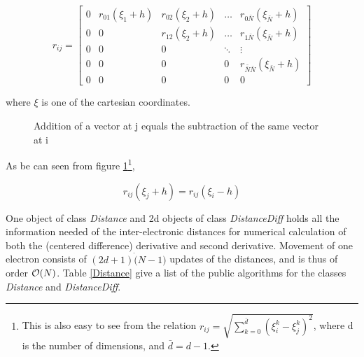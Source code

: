 \begin{equation}
  r_{ij} = \left[
  \begin{array}{ccccc}
    0 & r_{01}(\xi_1+h) & r_{02}(\xi_2+h)&\dots & r_{0 \bar{N}}(\xi_{\bar{N}}+h) \\
    0 &        0        & r_{12}(\xi_2+h)&\dots & r_{1 \bar{N}}(\xi_{\bar{N}}+h) \\
    0 &        0        &          0            &\ddots &  \vdots       \\
    0 &        0        &          0            &   0   &r_{\bar{\bar{N}} \bar{N}}(\xi_{\bar{N}}+h) \\
    0 &        0        &          0            &   0   &   0  
  \end{array} \right]
\label{r_ij_Diff}
\end{equation}

where $\xi$ is one of the cartesian coordinates. 

\begin{figure}[hbtp]
\begin{center}
  \caption{Addition of a vector at j equals the subtraction of the
  same vector at i}
  \label{vector_variation}
\end{center}
\end{figure}

As be can seen from figure \ref{vector_variation}\footnote{This is
  also easy to see from the relation $r_{ij} = \sqrt{
    \sum_{k=0}^{\bar{d}}(\xi_i^k-\xi_j^k)^2}$, 
where d is the number of dimensions, and $\bar{d}=d-1$.}, 

\begin{equation}
  r_{ij}(\xi_j+h) = r_{ij}(\xi_i-h)
\end{equation}

One object of class \emph{Distance} and 2d objects of class
\emph{DistanceDiff} holds all the information needed of the
inter-electronic distances for numerical calculation of both the
(centered difference) derivative and second derivative. Movement of
one electron consists of $(2d+1)\dot(N-1)$ updates of the distances,
and is thus of order ${\cal O}(N)$. Table \ref{Distance} give a list of the
public algorithms for the classes \emph{Distance} and
\emph{DistanceDiff}.

